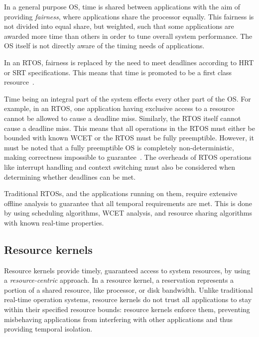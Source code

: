  In a general purpose \gls{OS}, time is shared between applications with the aim of providing \emph{fairness}, where applications share the processor equally.
 This fairness is not divided into equal share, but weighted, such that some applications are awarded more time than others in order to tune overall system performance.
The OS itself is not directly aware of the timing needs of applications.

 In an \gls{RTOS}, fairness is replaced by the need to meet deadlines according to \gls{HRT} or \gls{SRT} specifications.
 This means that time is promoted to be a first class resource~\citep{Stankovic_1988}.

Time being an integral part of the system effects every other part of the \gls{OS}.
For example, in an \gls{RTOS}, one application having exclusive access to a resource cannot be allowed to cause a deadline miss.
Similarly, the \gls{RTOS} itself cannot cause a deadline miss.
This means that all operations in the \gls{RTOS} must either be bounded with known {\gls{WCET}} or the \gls{RTOS} must be fully preemptible.
However, it must be noted that a fully preemptible \gls{OS} is completely non-deterministic, making correctness impossible to guarantee~\citep{Blackham_TH_12}.
 The overheads of \gls{RTOS} operations like interrupt handling and context switching must also be considered when determining whether deadlines can be met.

Traditional \glspl{RTOS}, and the applications running on them, require extensive offline analysis to guarantee that all temporal requirements are met.
This is done by using scheduling algorithms, \gls{WCET} analysis, and resource sharing algorithms with known real-time properties.

\subsection{Resource kernels}
\label{sec:resource-kernels}

Resource kernels provide timely, guaranteed access to system resources, by using a \emph{resource-centric} approach.
In a resource kernel, a reservation represents a portion of a shared resource, like processor, or disk bandwidth.
Unlike traditional real-time operation systems, resource kernels do not trust all applications to stay within their specified resource bounds: resource kernels enforce them, preventing misbehaving applications from interfering with other applications and thus providing temporal isolation.

